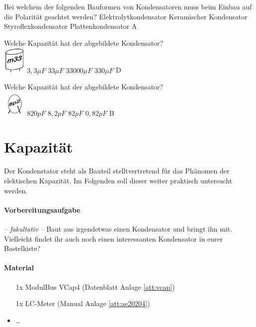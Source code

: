 {Bei welchem der folgenden Bauformen von
Kondensatoren muss beim Einbau auf die
Polarität geachtet werden?}%
{Elektrolytkondensator}%
{Keramischer Kondensator}%
{Styroflexkondensator}%
{Plattenkondensator}%
{A}%

{Welche Kapazität hat der abgebildete Kondensator?\\
\includegraphics[width=1.1cm]{TC203.png}
}%
{$3,3\mu F$}%
{$33\mu F$}%
{$33000\mu F$}%
{$330\mu F$}%
{D}%

{Welche Kapazität hat der abgebildete Kondensator?\\
\includegraphics[width=1.1cm]{TC205.png}
}%
{$820pF$}%
{$8,2pF$}%
{$82pF$}%
{$0,82pF$}%
{B}%


\clearpage

\section{Kapazität}

Der Kondenstator steht als Bauteil stelltvertretend für das Phänomen der
elektischen Kapazität. Im Folgenden soll dieser weiter praktisch untersucht
werden.

\paragraph{Vorbereitungsaufgabe}

\emph{-- fakultativ --} Baut aus irgendetwas einen Kondensator und bringt ihn mit.
Vielleicht findet ihr auch noch einen interessanten Kondensator in eurer
Bastelkiste?


\paragraph{Material}

\begin{itemize}
  \item[1x] ModulBus VCap4 (Datenblatt Anlage \ref{att:vcap})
  \item[1x] LC-Meter (Manual Anlage \ref{att:ae20204})
  \item \dots
\end{itemize}

